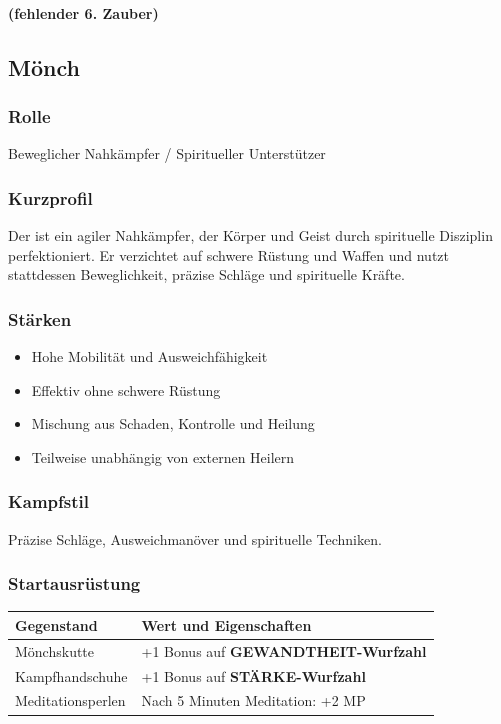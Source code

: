 \paragraph*{(fehlender 6. Zauber)}

\subsection{Mönch}

\subsubsection*{Rolle}
Beweglicher Nahkämpfer / Spiritueller Unterstützer

\subsubsection*{Kurzprofil}
Der  ist ein agiler Nahkämpfer, der Körper und Geist
durch spirituelle Disziplin perfektioniert.
Er verzichtet auf schwere Rüstung und Waffen und nutzt stattdessen
Beweglichkeit, präzise Schläge und spirituelle Kräfte.

\subsubsection*{Stärken}
\begin{itemize}
	\item Hohe Mobilität und Ausweichfähigkeit
	\item Effektiv ohne schwere Rüstung
	\item Mischung aus Schaden, Kontrolle und Heilung
	\item Teilweise unabhängig von externen Heilern
\end{itemize}

\subsubsection*{Kampfstil}
Präzise Schläge, Ausweichmanöver und spirituelle Techniken.

\subsubsection*{Startausrüstung}

\begin{center}
	\begin{tabular}{lp{9cm}}
		\toprule
		\textbf{Gegenstand} & \textbf{Wert und Eigenschaften} \\
		\midrule
		Mönchskutte & +1 Bonus auf \textbf{GEWANDTHEIT-Wurfzahl} \\
		Kampfhandschuhe & +1 Bonus auf \textbf{STÄRKE-Wurfzahl} \\
		Meditationsperlen & Nach 5 Minuten Meditation: +2 MP \\
		\bottomrule
	\end{tabular}
\end{center}

